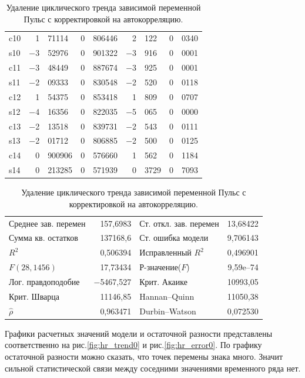\documentclass[a4paper,12pt]{article}
\begin{document}
\begin{table}[H]
\begin{center}
\begin{tabular}{lr@{,}lr@{,}lr@{,}lr@{,}l}
		c10 &		1&71114 &		0&806446 &		2&122 &		0&0340 \\
		s10 &		$-$3&52976 &		0&901322 &		$-$3&916 &		0&0001 \\
		c11 &		$-$3&48449 &		0&887674 &		$-$3&925 &		0&0001 \\
		s11 &		$-$2&09333 &		0&830548 &		$-$2&520 &		0&0118 \\
		c12 &		1&54375 &		0&853418 &		1&809 &		0&0707 \\
		s12 &		$-$4&16356 &		0&822035 &		$-$5&065 &		0&0000 \\
		c13 &		$-$2&13518 &		0&839731 &		$-$2&543 &		0&0111 \\
		s13 &		$-$2&01712 &		0&806885 &		$-$2&500 &		0&0125 \\
		c14 &		0&900906 &		0&576660 &		1&562 &		0&1184 \\
		s14 &		0&213285 &		0&571939 &		0&3729 &		0&7093 \\
	\end{tabular}
	
	\vspace{1ex}
	\begin{tabular}{lrlr}
		Среднее зав. перемен &  157,6983 & Ст. откл. зав. перемен &  13,68422 \\
		Сумма кв. остатков &  137168,6 & Ст. ошибка модели &  9,706143 \\
		$R^2$ &  0,506394 & Исправленный $R^2$ &  0,496901 \\
		$F(28, 1456)$ &  17,73434 & Р-значение($F$) &  9,59\textrm{e--74} \\
		Лог. правдоподобие & $-$5467,527 & Крит. Акаике &  10993,05 \\
		Крит. Шварца &  11146,85 & Hannan--Quinn &  11050,38 \\
		$\hat{\rho}$ &  0,963471 & Durbin--Watson &  0,072530 \\
	\end{tabular}
\end{center}
\caption{Удаление циклического тренда зависимой переменной Пульс с корректировкой на автокорреляцию.}
\label{tab:table1}
\end{table}

Графики расчетных значений модели и остаточной разности представлены соответственно на рис.\ref{fig:hr_trend0} и рис.\ref{fig:hr_error0}. По графику остаточной разности можно сказать, что точек перемены знака много. Значит сильной статистической связи между соседними значениями временного ряда нет. 
\end{document}
